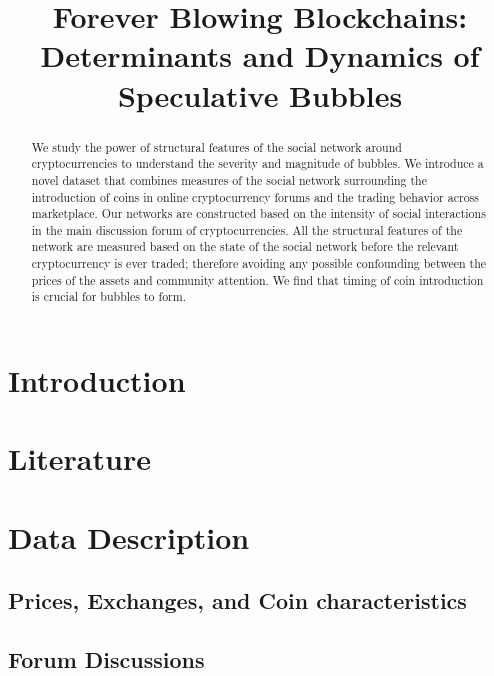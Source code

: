 \documentclass[letterpaper]{article}
\begin{document}
%
\title{Forever Blowing Blockchains: Determinants and Dynamics of Speculative Bubbles}

\maketitle


\begin{abstract}
We study the power of structural features of the social network around cryptocurrencies to understand the severity and magnitude of bubbles. We introduce a novel dataset that combines measures of the social network surrounding the introduction of coins in online cryptocurrency forums and the trading behavior across marketplace. Our networks are constructed based on the intensity of social interactions in the main discussion forum of cryptocurrencies. All the structural features of the network are measured based on the state of the social network before the relevant cryptocurrency is ever traded; therefore avoiding any possible confounding between the prices of the assets and community attention.
We find that timing of coin introduction is crucial for bubbles to form.

\end{abstract}

\section{Introduction}

\section{Literature}


\section{Data Description}
\subsection{Prices, Exchanges, and Coin characteristics}



\subsection{Forum Discussions}

\end{document}
